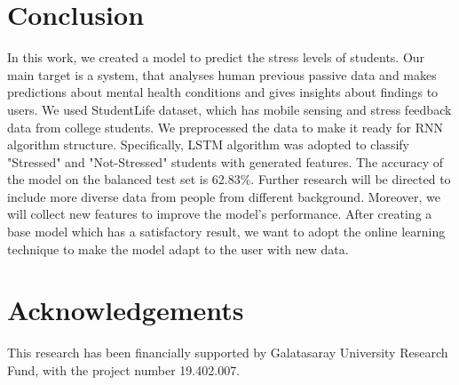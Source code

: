 \documentclass[3p,times,procedia]{elsarticle}
\begin{document}
\section{Conclusion}
In this work, we created a model to predict the stress levels of students. Our main target is a system, that analyses human previous passive data and makes predictions about mental health conditions and gives insights about findings to users. We used StudentLife dataset, which has mobile sensing and stress feedback data from college students. We preprocessed the data to make it ready for RNN algorithm structure. Specifically, LSTM algorithm was adopted to classify "Stressed" and "Not-Stressed" students with generated features. The accuracy of the model on the balanced test set is 62.83\%. Further research will be directed to include more diverse data from people from different background. Moreover, we will collect new features to improve the model's performance. After creating a base model which has a satisfactory result, we want to adopt the online learning technique to make the model adapt to the user with new data.


\section*{Acknowledgements}
This research has been financially supported by Galatasaray University Research Fund, with the project number 19.402.007.
\end{document}
